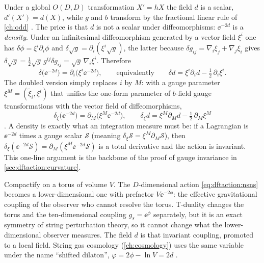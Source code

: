 Under a global $O(D,D)$ transformation $X'=hX$ the field $d$ is a scalar, $d'(X')=d(X)$, while
$g$ and $b$ transform by the fractional linear rule of \cref{ch:odd}
. The price is that $d$ is not a scalar under
diffeomorphisms: $\ee^{-2d}$ is a \emph{density}. Under an
infinitesimal diffeomorphism generated by a vector field $\xi^i$ one has
$\delta\phi=\xi^i\partial_i\phi$ and $\delta\sqrt g=\partial_i(\xi^i\sqrt g)$, the latter
because $\delta g_{ij}=\nabla_i\xi_j+\nabla_j\xi_i$ gives
$\delta\sqrt g=\tfrac12\sqrt g\,g^{ij}\delta g_{ij}=\sqrt g\,\nabla_i\xi^i$. Therefore
\begin{equation}\label{eq:dftaction:density}
\delta\bigl(\ee^{-2d}\bigr)=\partial_i\bigl(\xi^i\ee^{-2d}\bigr),\qquad\text{equivalently}
\qquad \delta d=\xi^i\partial_id-\tfrac12\,\partial_i\xi^i .
\end{equation}
The doubled version simply replaces $i$ by $M$: with a gauge parameter
$\xi^M=(\tilde\xi_i,\xi^i)$ that unifies the one-form parameter of $b$-field gauge
transformations with the vector field of diffeomorphisms,
\begin{equation}\label{eq:dftaction:ddensity}
\delta_\xi\bigl(\ee^{-2d}\bigr)=\partial_M\bigl(\xi^M\ee^{-2d}\bigr),\qquad
\delta_\xi d=\xi^M\partial_Md-\tfrac12\,\partial_M\xi^M
\end{equation}
. A density is exactly what an integration measure must be: if a
Lagrangian is $\ee^{-2d}$ times a gauge scalar $\mathcal S$ (meaning
$\delta_\xi\mathcal S=\xi^M\partial_M\mathcal S$), then
$\delta_\xi(\ee^{-2d}\mathcal S)=\partial_M(\xi^M\ee^{-2d}\mathcal S)$ is a total derivative and
the action is invariant. This one-line argument is the backbone of the proof of gauge invariance
in \cref{sec:dftaction:curvature}.

\begin{physicsbox}
Compactify on a torus of volume $V$. The $D$-dimensional action \eqref{eq:dftaction:nsns}
becomes a lower-dimensional one with prefactor $V\ee^{-2\phi}$: the effective gravitational
coupling of the observer who cannot resolve the torus. T-duality changes the torus and the
ten-dimensional coupling $g_s=\ee^{\phi}$ separately, but it is an exact symmetry of string
perturbation theory, so it cannot change what the lower-dimensional observer measures. The
field $d$ is that invariant coupling, promoted to a local field. String gas cosmology
(\cref{ch:cosmology}) uses the same variable under the name ``shifted dilaton'',
$\varphi=2\phi-\ln V=2d$ .
\end{physicsbox}

